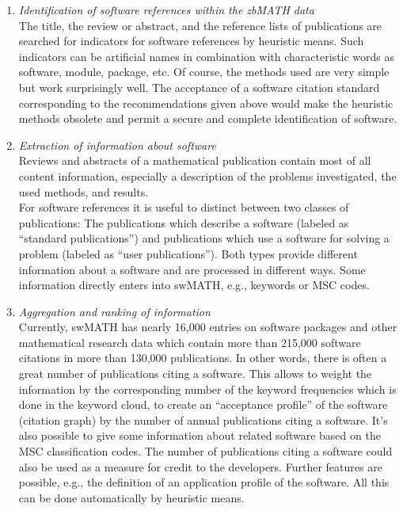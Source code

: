 \documentclass[12pt]{article}
\begin{document}
\begin{enumerate}
\item{\textit{Identification of software references within the zbMATH
    data}}\\ The title, the review or abstract, and the reference lists of
  publications are searched for indicators for software references by heuristic
  means. Such indicators can be artificial names in combination with
  characteristic words as software, module, package, etc.  Of course, the
  methods used are very simple but work surprisingly well. The acceptance of a
  software citation standard corresponding to the recommendations given above
  would make the heuristic methods obsolete and permit a secure and complete
  identification of software.
\item{\textit{Extraction of information about software}}\\ Reviews and
  abstracts of a mathematical publication contain most of all content
  information, especially a description of the problems investigated, the used
  methods, and results. \\ For software references it is useful to distinct
  between two classes of publications: The publications which describe a
  software (labeled as ``standard publications'') and publications which use a
  software for solving a problem (labeled as ``user publications''). Both types
  provide different information about a software and are processed in different
  ways. Some information directly enters into swMATH, e.g., keywords or MSC
  codes.
\item{\textit{Aggregation and ranking of information}}\\ Currently, swMATH has
  nearly 16,000 entries on software packages and other mathematical research
  data which contain more than 215,000 software citations in more than 130,000
  publications. In other words, there is often a great number of publications
  citing a software. This allows to weight the information by the corresponding
  number of the keyword frequencies which is done in the keyword cloud, to
  create an ``acceptance profile'' of the software (citation graph) by the
  number of annual publications citing a software.  It's also possible to give
  some information about related software based on the MSC classification
  codes. The number of publications citing a software could also be used as a
  measure for credit to the developers. Further features are possible, e.g.,
  the definition of an application profile of the software. All this can be
  done automatically by heuristic means.
\end{enumerate}
\end{document}
